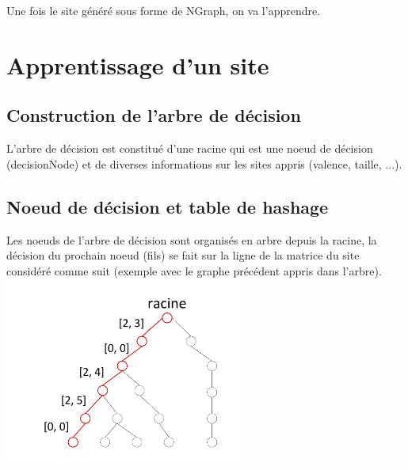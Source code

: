 \documentclass[a4paper,10pt]{article}
\begin{document}

Une fois le site généré sous forme de NGraph, on va l'apprendre.

\section{Apprentissage d'un site}
\subsection{Construction de l'arbre de décision}
L'arbre de décision est constitué d'une racine qui est une noeud de décision (decisionNode) et de diverses informations sur les sites appris (valence, taille, ...).

\subsection{Noeud de décision et table de hashage}
Les noeuds de l'arbre de décision sont organisés en arbre depuis la racine, la décision du prochain noeud (fils) se fait sur la ligne de la matrice du site considéré comme suit (exemple avec le graphe précédent appris dans l'arbre).\\
\includegraphics[width=0.6\textwidth]{src/img/arbredecision2.pdf}\\
\end{document}
